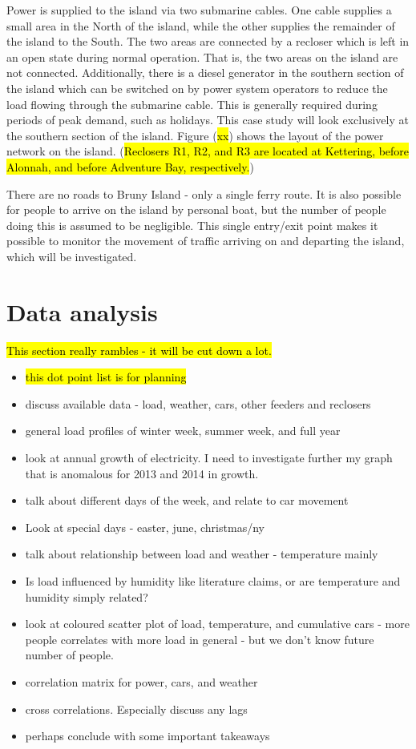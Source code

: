 Power is supplied to the island via two submarine cables.
One cable supplies a small area in the North of the island, while the other supplies the remainder of the island to the South.
The two areas are connected by a recloser which is left in an open state during normal operation.
That is, the two areas on the island are not connected.
Additionally, there is a diesel generator in the southern section of the island which can be switched on by power system operators to reduce the load flowing through the submarine cable.
This is generally required during periods of peak demand, such as holidays.
This case study will look exclusively at the southern section of the island.
Figure (\hl{xx}) shows the layout of the power network on the island.
(\hl{Reclosers R1, R2, and R3 are located at Kettering, before Alonnah, and before Adventure Bay, respectively.})

There are no roads to Bruny Island - only a single ferry route.
It is also possible for people to arrive on the island by personal boat, but the number of people doing this is assumed to be negligible.
This single entry/exit point makes it possible to monitor the movement of traffic arriving on and departing the island, which will be investigated.



\section{Data analysis}
\label{bruny-data-analysis}
\hl{This section really rambles - it will be cut down a lot.}
\begin{itemize}
	\item \hl{this dot point list is for planning}
	\item discuss available data - load, weather, cars, other feeders and reclosers
	\item general load profiles of winter week, summer week, and full year
	\item look at annual growth of electricity. I need to investigate further my graph that is anomalous for 2013 and 2014 in growth.
	\item talk about different days of the week, and relate to car movement
	\item Look at special days - easter, june, christmas/ny
	\item talk about relationship between load and weather - temperature mainly
	\item Is load influenced by humidity like literature claims, or are temperature and humidity simply related?
	\item look at coloured scatter plot of load, temperature, and cumulative cars - more people correlates with more load in general - but we don't know future number of people.
	\item correlation matrix for power, cars, and weather
	\item cross correlations. Especially discuss any lags
	\item perhaps conclude with some important takeaways
	
\end{itemize}

